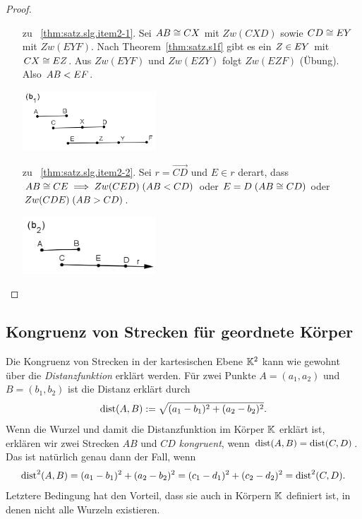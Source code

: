 \begin{proof}
\begin{enumerate}
        \item[zu ~\ref{thm:satz.slg.item2-1}.] Sei ${AB} \cong {CX}$ mit $Zw(CXD)$ sowie
            ${CD} \cong {EY}$ mit $Zw(EYF)$. Nach Theorem~\ref{thm:satz.s1f} gibt es ein $Z
            \in {EY}$ mit ${CX} \cong {EZ}$. Aus $Zw(EYF)$ und $Zw(EZY)$ folgt
            $Zw(EZF)$ (Übung). %
            Also ${AB} < {EF}$.

            \centerline{\includegraphics[width=5cm]{BILDER/1-2-06b1-Ord.png}}

        \item[zu ~\ref{thm:satz.slg.item2-2}.] Sei $r = \overrightarrow{CD}$ und $E \in r$ derart,
            dass ${AB} \cong {CE}\; \Longrightarrow\; Zw(CED)\; ({AB} < {CD})$ oder
            $E = D\; ({AB} \cong {CD})$ oder $Zw(CDE)\; ({AB} > {CD})$.

            \centerline{\includegraphics[width=5cm]{BILDER/1-2-06b2-Ord.png}}
    \end{enumerate}
\end{proof}

\subsection*{Kongruenz von Strecken für geordnete Körper}

Die Kongruenz von Strecken in der kartesischen Ebene $\mathbb K^2$ kann wie gewohnt über die {\em
Distanzfunktion} erklärt werden. Für zwei Punkte $A = (a_1,a_2)$ und $B = (b_1,b_2)$ ist die Distanz
erklärt durch
$$
    \operatorname{dist}(A,B) := \sqrt{(a_1-b_1)^2 + (a_2-b_2)^2} .
$$
Wenn die Wurzel und damit die Distanzfunktion im Körper $\mathbb K$ erklärt ist, erklären wir zwei Strecken
$AB$ und $CD$ {\em kongruent}, wenn $\operatorname{dist}(A,B) = \operatorname{dist}(C,D)$. Das ist natürlich genau dann der
Fall, wenn
$$
\operatorname{dist}^2(A,B) = (a_1 - b_1)^2 + (a_2 - b_2)^2 = (c_1 - d_1)^2 + (c_2 - d_2)^2 = \operatorname{dist}^2(C,D).
$$
Letztere Bedingung hat den Vorteil, dass sie auch in Körpern $\mathbb K$ definiert ist, in denen nicht alle
Wurzeln existieren.

